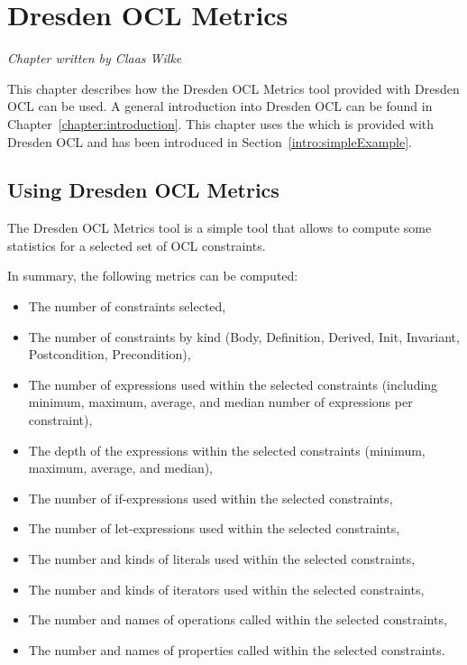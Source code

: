 \chapter{Dresden OCL Metrics}
\label{chapter:metrics}

\begin{flushright}
\textit{Chapter written by Claas Wilke}
\end{flushright}

This chapter describes how the Dresden OCL Metrics tool provided with Dresden
OCL can be used. A general introduction into Dresden OCL can be found in
Chapter~\ref{chapter:introduction}. This chapter uses the  which is provided with Dresden OCL and has been introduced in
Section~\ref{intro:simpleExample}.



\section{Using Dresden OCL Metrics}

The Dresden OCL Metrics tool is a simple tool that allows to compute some
statistics for a selected set of OCL constraints.

In summary, the following metrics can be computed:

\begin{itemize}
  \item The number of constraints selected,
  \item The number of constraints by kind (Body, Definition, Derived,
  Init, Invariant, Postcondition, Precondition),
  \item The number of expressions used within the selected constraints
  (including minimum, maximum, average, and median number of expressions per
  constraint),
  \item The depth of the expressions within the selected constraints (minimum,
  maximum, average, and median),
  \item The number of if-expressions used within the selected constraints,
  \item The number of let-expressions used within the selected constraints,
  \item The number and kinds of literals used within the selected constraints,
  \item The number and kinds of iterators used within the selected constraints,
  \item The number and names of operations called within the selected
  constraints,
  \item The number and names of properties called within the selected
  constraints.
\end{itemize}

